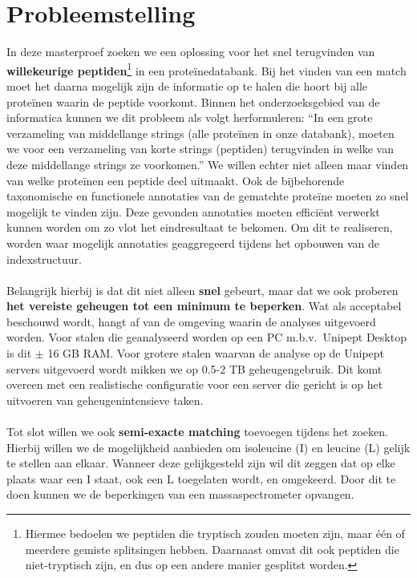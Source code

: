 \section{Probleemstelling}\label{sec:probleemstelling}
In deze masterproef zoeken we een oplossing voor het snel terugvinden van \textbf{willekeurige peptiden}\footnote{Hiermee bedoelen we peptiden die tryptisch zouden moeten zijn, maar één of meerdere gemiste splitsingen hebben. Daarnaast omvat dit ook peptiden die niet-tryptisch zijn, en dus op een andere manier gesplitst worden.} in een proteïnedatabank.
Bij het vinden van een match moet het daarna mogelijk zijn de informatie op te halen die hoort bij alle proteïnen waarin de peptide voorkomt.
Binnen het onderzoeksgebied van de informatica kunnen we dit probleem als volgt herformuleren:
``In een grote verzameling van middellange strings (alle proteïnen in onze databank), moeten we voor een verzameling van korte strings (peptiden) terugvinden in welke van deze middellange strings ze voorkomen.''
We willen echter niet alleen maar vinden van welke proteïnen een peptide deel uitmaakt.
Ook de bijbehorende taxonomische en functionele annotaties van de gematchte proteïne moeten zo snel mogelijk te vinden zijn.
Deze gevonden annotaties moeten efficiënt verwerkt kunnen worden om zo vlot het eindresultaat te bekomen.
Om dit te realiseren, worden waar mogelijk annotaties geaggregeerd tijdens het opbouwen van de indexstructuur.
\\ \\
Belangrijk hierbij is dat dit niet alleen \textbf{snel} gebeurt, maar dat we ook proberen \textbf{het vereiste geheugen tot een minimum te beperken}.
Wat als acceptabel beschouwd wordt, hangt af van de omgeving waarin de analyses uitgevoerd worden.
Voor stalen die geanalyseerd worden op een PC m.b.v.~Unipept Desktop is dit $\pm$ 16 GB RAM\@.
Voor grotere stalen waarvan de analyse op de Unipept servers uitgevoerd wordt mikken we op 0.5-2 TB geheugengebruik.
Dit komt overeen met een realistische configuratie voor een server die gericht is op het uitvoeren van geheugenintensieve taken.
\\ \\
Tot slot willen we ook \textbf{semi-exacte matching} toevoegen tijdens het zoeken.
Hierbij willen we de mogelijkheid aanbieden om isoleucine (I) en leucine (L) gelijk te stellen aan elkaar.
Wanneer deze gelijkgesteld zijn wil dit zeggen dat op elke plaats waar een I staat, ook een L toegelaten wordt, en omgekeerd.
Door dit te doen kunnen we de beperkingen van een massaspectrometer opvangen.
